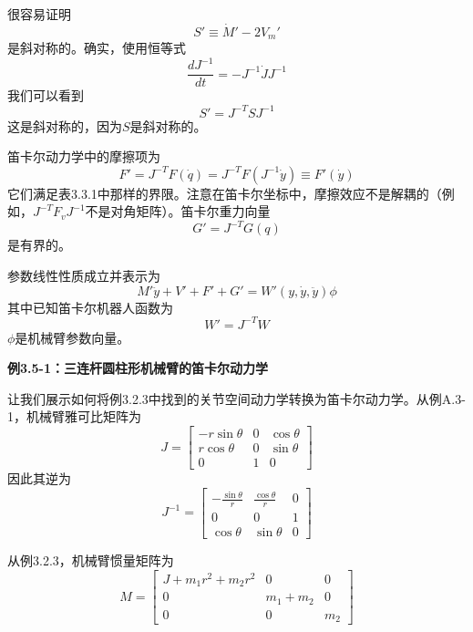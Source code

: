 \documentclass[12pt,a4paper]{ctexart}
\begin{document}
很容易证明
\begin{equation}
S' \equiv \dot{M}' - 2V_m'
\end{equation}
是斜对称的。确实，使用恒等式
\begin{equation}
\frac{dJ^{-1}}{dt} = -J^{-1}\dot{J}J^{-1}
\end{equation}
我们可以看到
\begin{equation}
S' = J^{-T}SJ^{-1}
\end{equation}
这是斜对称的，因为$S$是斜对称的。

笛卡尔动力学中的摩擦项为
\begin{equation}
F' = J^{-T}F(\dot{q}) = J^{-T}F(J^{-1}\dot{y}) \equiv F'(\dot{y})
\end{equation}
它们满足表3.3.1中那样的界限。注意在笛卡尔坐标中，摩擦效应不是解耦的（例如，$J^{-T}F_vJ^{-1}$不是对角矩阵）。笛卡尔重力向量
\begin{equation}
G' = J^{-T}G(q)
\end{equation}
是有界的。

参数线性性质成立并表示为
\begin{equation}
M'\ddot{y} + V' + F' + G' = W'(y,\dot{y},\ddot{y})\phi
\end{equation}
其中已知笛卡尔机器人函数为
\begin{equation}
W' = J^{-T}W
\end{equation}
$\phi$是机械臂参数向量。

\textbf{例3.5-1：三连杆圆柱形机械臂的笛卡尔动力学}

让我们展示如何将例3.2.3中找到的关节空间动力学转换为笛卡尔动力学。从例A.3-1，机械臂雅可比矩阵为
\begin{equation}
J = \begin{bmatrix} -r\sin\theta & 0 & \cos\theta \\ r\cos\theta & 0 & \sin\theta \\ 0 & 1 & 0 \end{bmatrix}
\end{equation}
因此其逆为
\begin{equation}
J^{-1} = \begin{bmatrix} -\frac{\sin\theta}{r} & \frac{\cos\theta}{r} & 0 \\ 0 & 0 & 1 \\ \cos\theta & \sin\theta & 0 \end{bmatrix}
\end{equation}

从例3.2.3，机械臂惯量矩阵为
\begin{equation}
M = \begin{bmatrix} J + m_1r^2 + m_2r^2 & 0 & 0 \\ 0 & m_1 + m_2 & 0 \\ 0 & 0 & m_2 \end{bmatrix}
\end{equation}
\end{document}
